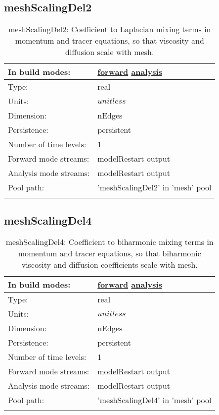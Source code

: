\subsection[meshScalingDel2]{meshScalingDel2}
\label{subsec:var_sec_mesh_meshScalingDel2}
\begin{center}
\begin{longtable}{| p{2.0in} | p{4.0in} |}
        \hline 
        In build modes: & \hyperref[subsec:forward_var_tab_mesh]{forward} \hyperref[subsec:analysis_var_tab_mesh]{analysis} \\
        \hline 
        Type: & real \\
        \hline 
        Units: & $unitless$ \\
        \hline 
        Dimension: & nEdges \\
        \hline 
        Persistence: & persistent \\
        \hline 
        Number of time levels: & 1 \\
        \hline 
		 Forward mode streams: &  modelRestart output \\
        \hline 
		 Analysis mode streams: &  modelRestart output \\
        \hline 
            Pool path: & 'meshScalingDel2' in 'mesh' pool
 \\
		 \hline 
    \caption{meshScalingDel2: Coefficient to Laplacian mixing terms in momentum and tracer equations, so that viscosity and diffusion scale with mesh.}
\end{longtable}
\end{center}
\subsection[meshScalingDel4]{meshScalingDel4}
\label{subsec:var_sec_mesh_meshScalingDel4}
\begin{center}
\begin{longtable}{| p{2.0in} | p{4.0in} |}
        \hline 
        In build modes: & \hyperref[subsec:forward_var_tab_mesh]{forward} \hyperref[subsec:analysis_var_tab_mesh]{analysis} \\
        \hline 
        Type: & real \\
        \hline 
        Units: & $unitless$ \\
        \hline 
        Dimension: & nEdges \\
        \hline 
        Persistence: & persistent \\
        \hline 
        Number of time levels: & 1 \\
        \hline 
		 Forward mode streams: &  modelRestart output \\
        \hline 
		 Analysis mode streams: &  modelRestart output \\
        \hline 
            Pool path: & 'meshScalingDel4' in 'mesh' pool
 \\
		 \hline 
    \caption{meshScalingDel4: Coefficient to biharmonic mixing terms in momentum and tracer equations, so that biharmonic viscosity and diffusion coefficients scale with mesh.}
\end{longtable}
\end{center}
